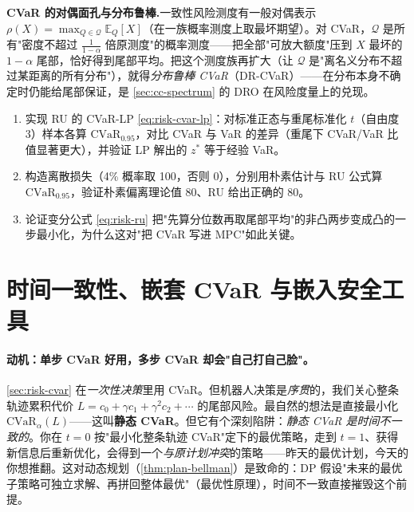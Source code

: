 \begin{note}
\textbf{CVaR 的对偶面孔与分布鲁棒.}\;一致性风险测度有一般对偶表示 $\rho(X)=\max_{Q\in\mathcal{Q}}\mathbb{E}_Q[X]$（在一族概率测度上取最坏期望）。对 CVaR，$\mathcal{Q}$ 是所有"密度不超过 $\frac{1}{1-\alpha}$ 倍原测度"的概率测度——把全部"可放大额度"压到 $X$ 最坏的 $1-\alpha$ 尾部，恰好得到尾部平均。把这个测度族再扩大（让 $\mathcal{Q}$ 是"离名义分布不超过某距离的所有分布"），就得\emph{分布鲁棒 CVaR}（DR-CVaR）——在分布本身不确定时仍能给尾部保证，是 \cref{sec:cc-spectrum} 的 DRO 在风险度量上的兑现。
\end{note}

\begin{practice}
\begin{enumerate}
  \item 实现 RU 的 CVaR-LP \cref{eq:risk-cvar-lp}：对标准正态与重尾标准化 $t$（自由度 3）样本各算 $\mathrm{CVaR}_{0.95}$，对比 CVaR 与 VaR 的差异（重尾下 CVaR/VaR 比值显著更大），并验证 LP 解出的 $z^*$ 等于经验 VaR。
  \item 构造离散损失（4\% 概率取 100，否则 0），分别用朴素估计与 RU 公式算 $\mathrm{CVaR}_{0.95}$，验证朴素偏离理论值 80、RU 给出正确的 80。
  \item 论证变分公式 \cref{eq:risk-ru} 把"先算分位数再取尾部平均"的非凸两步变成凸的一步最小化，为什么这对"把 CVaR 写进 MPC"如此关键。
\end{enumerate}
\end{practice}

\section{时间一致性、嵌套 CVaR 与嵌入安全工具}
\label{sec:risk-nested}

\paragraph{动机：单步 CVaR 好用，多步 CVaR 却会"自己打自己脸"。}
\cref{sec:risk-cvar} 在\emph{一次性决策}里用 CVaR。但机器人决策是\emph{序贯}的，我们关心整条轨迹累积代价 $L=c_0+\gamma c_1+\gamma^2c_2+\cdots$ 的尾部风险。最自然的想法是直接最小化 $\mathrm{CVaR}_\alpha(L)$——这叫\textbf{静态 CVaR}。但它有个深刻陷阱：\emph{静态 CVaR 是时间不一致的}。你在 $t=0$ 按"最小化整条轨迹 CVaR"定下的最优策略，走到 $t=1$、获得新信息后重新优化，会得到一个\emph{与原计划冲突}的策略——昨天的最优计划，今天的你想推翻。这对动态规划（\cref{thm:plan-bellman}）是致命的：DP 假设"未来的最优子策略可独立求解、再拼回整体最优"（最优性原理），时间不一致直接摧毁这个前提。

